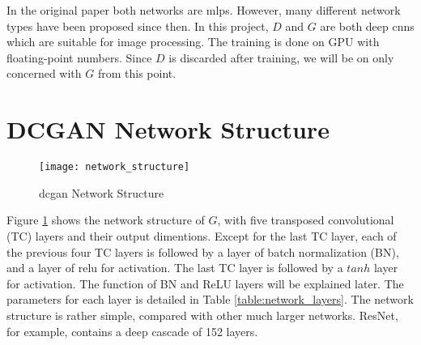 In the original paper both networks are \glspl{mlp}. However, many different network types have been
proposed since then. In this project, $D$ and $G$ are both deep \glspl{cnn} \cite{radford:conv_gan}
which are suitable for image processing. The training is done on GPU with floating-point numbers. Since $D$ is
discarded after training, we will be on only concerned with $G$ from this point.

\section{DCGAN Network Structure}

\begin{figure}[h]
  \centering
  \texttt{[image: network\_structure]}
  \caption{\gls{dcgan} \cite{radford:conv_gan} Network Structure}
  \label{fig:network_structure}
\end{figure}

Figure \ref{fig:network_structure} shows the network structure of $G$, with five transposed convolutional (TC)
layers and their output dimentions. Except for the last TC layer, each of the previous four TC layers is
followed by a layer of batch normalization (BN), and a layer of \gls{relu} for activation. The last TC layer
is followed by a $tanh$ layer for activation. The function of BN and ReLU layers will be explained later.
The parameters for each layer is detailed in Table \ref{table:network_layers}. The network structure is
rather simple, compared with other much larger networks. ResNet, for example, contains a deep cascade of
152 layers.

